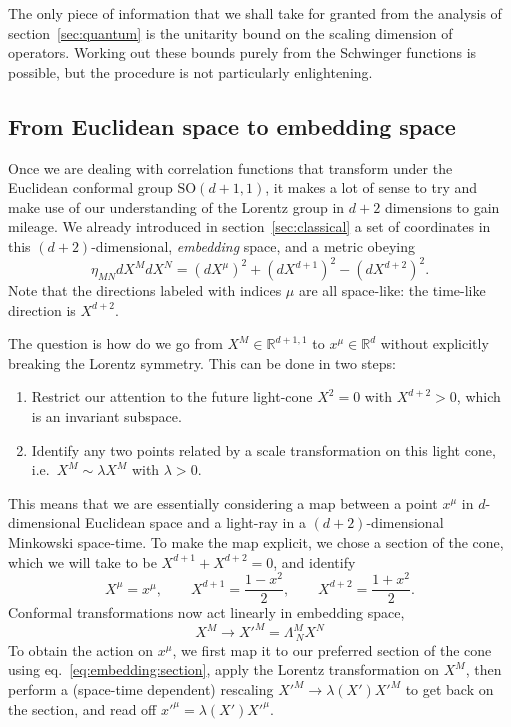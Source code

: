 \documentclass[a4paper,12pt]{article}
\newcommand{\SO}{\text{SO}}
\numberwithin{equation}{section}
\begin{document}
The only piece of information that we shall take for granted from the analysis of section~\ref{sec:quantum} is the unitarity bound on the scaling dimension of operators. Working out these bounds purely from the Schwinger functions is possible, but the procedure is not particularly enlightening.


\subsection{From Euclidean space to embedding space}

Once we are dealing with correlation functions that transform under the Euclidean conformal group $\SO(d + 1, 1)$, it makes a lot of sense to try and make use of our understanding of the Lorentz group in $d+2$ dimensions to gain mileage. We already introduced in section~\ref{sec:classical} a set of coordinates in this  $(d+2)$-dimensional, \emph{embedding} space, and a metric obeying
\begin{equation}
	\eta_{MN} dX^M dX^N
	= (dX^\mu)^2 + (dX^{d+1})^2 - (dX^{d+2})^2.
\end{equation}
Note that the directions labeled with indices $\mu$ are all space-like: the time-like direction is $X^{d+2}$.

The question is how do we go from $X^M \in \mathbb{R}^{d+1,1}$ to $x^\mu \in \mathbb{R}^d$ without explicitly breaking the Lorentz symmetry. This can be done in two steps:
%
\begin{enumerate}

\item
Restrict our attention to the future light-cone $X^2 = 0$ with $X^{d+2} > 0$, which is an invariant subspace.

\item
Identify any two points related by a scale transformation on this light cone, i.e.~$X^M \sim \lambda X^M$ with $\lambda > 0$.

\end{enumerate}
%
This means that we are essentially considering a map between a point $x^\mu$ in $d$-dimensional Euclidean space and a light-ray in a $(d + 2)$-dimensional Minkowski space-time.
To make the map explicit, we chose a section of the cone, which we will take to be $X^{d+1} + X^{d+2} = 0$,
and identify
\begin{equation}
	X^\mu = x^\mu,
	\qquad
	X^{d+1} = \frac{1 - x^2}{2},
	\qquad
	X^{d+2} = \frac{1 + x^2}{2}.
	\label{eq:embedding:section}
\end{equation}
Conformal transformations now act linearly in embedding space,
\begin{equation}
	X^M \to X'^M = \Lambda^M_{~N} X^N
\end{equation}
To obtain the action on $x^\mu$, we first map it to our preferred section of the cone using eq.~\eqref{eq:embedding:section}, apply the Lorentz transformation on $X^M$, then perform a (space-time dependent) rescaling $X'^M \to \lambda(X') X'^M$ to get back on the section, and read off $x'^\mu = \lambda(X') X'^\mu$.
\end{document}
